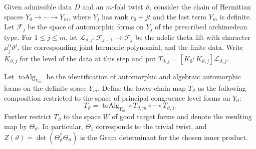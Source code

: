 \begin{definition}
\label{def:target-theta-lift}
\emitthmsource
Given admissible data $D$ and an $m$-fold twist $\vartheta$, consider the chain of Hermitian spaces $Y_0\to\cdots\to Y_m$, where $Y_j$ has rank $r_0+jt$ and the last term $Y_m$ is definite. Let $\mathcal F_j$ be the space of automorphic forms on $Y_j$ of the prescribed archimedean type. For $1\le j\le m$, let $\mathcal L_{\vartheta,j}\colon\mathcal F_{j-1}\to\mathcal F_j$ be the adelic theta lift with character $\mu_j^0\vartheta^j$, the corresponding joint harmonic polynomial, and the finite data. Write $K_{\vartheta,j}$ for the level of the data at this step and put $T_{\vartheta,j}=[K_0:K_{\vartheta,j}]\mathcal L_{\vartheta,j}$.

Let $\operatorname{toAlg}_{Y_m}$ be the identification of automorphic and algebraic automorphic forms on the definite space $Y_m$. Define the lower-chain map $T_\vartheta$ as the following composition restricted to the space of principal congruence level forms on $Y_0$:
\begin{equation}
 T_\vartheta=\operatorname{toAlg}_{Y_m}\circ T_{\vartheta,m}\circ\cdots\circ T_{\vartheta,1}.
 \label{eq:lower-theta-chain}
\end{equation}
Further restrict $T_\vartheta$ to the space $W$ of good target forms and denote the resulting map by $\Theta_\vartheta$. In particular, $\Theta_1$ corresponds to the trivial twist, and $Z(\vartheta)=\det(\Theta_\vartheta^*\Theta_\vartheta)$ is the Gram determinant for the chosen inner product.
\end{definition}

